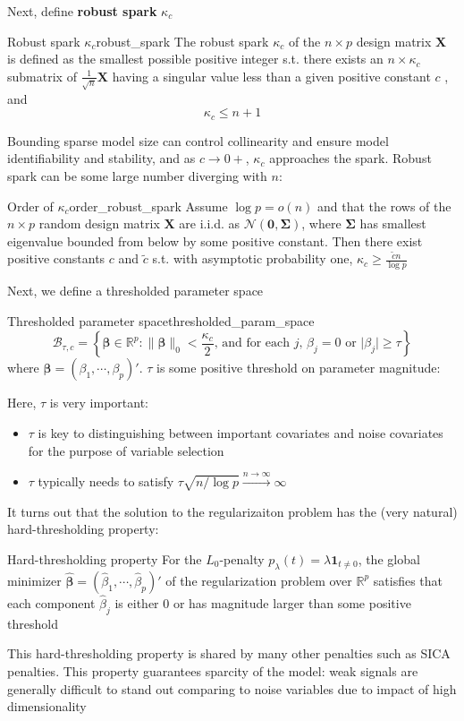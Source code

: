 \documentclass[twoside]{article}
\begin{document}
Next, define \textbf{robust spark} $\kappa_c$
\begin{definition}{Robust spark $\kappa_c$}{robust_spark}
    The robust spark $\kappa_c$ of the $n\times p$ design matrix $\mathbf{X}$ is defined as the smallest possible positive integer s.t. there exists an $n\times \kappa_c$ submatrix of $\frac{1}{\sqrt{n}}\mathbf{X}$ having a singular value less than a given positive constant $c$ \citep{zheng2014high}, and $$\kappa_c\leq n+1$$
\end{definition}
Bounding sparse model size can control collinearity and ensure model identifiability and stability, and as $c\rightarrow 0+$, $\kappa_c$ approaches the spark. Robust spark can be some large number diverging with $n$:
\begin{proposition}{Order of $\kappa_c$}{order_robust_spark}
    Assume $\log p=o(n)$ and that the rows of the $n\times p$ random design matrix $\mathbf{X}$ are i.i.d. as $\mathcal{N}(\mathbf{0},\boldsymbol{\Sigma})$, where $\boldsymbol{\Sigma}$ has smallest eigenvalue bounded from below by some positive constant. Then there exist positive constants $c$ and $\tilde{c}$ s.t. with asymptotic probability one, $\kappa_c \geq \frac{\tilde{c}n}{\log p} $
\end{proposition}

Next, we define a thresholded parameter space
\begin{definition}{Thresholded parameter space}{thresholded_param_space}
    $$
    \mathcal{B}_{\tau,c} = \left\{ \boldsymbol{\beta}\in\mathbb{R}^p: \lVert \boldsymbol{\beta} \rVert _0 <\frac{\kappa_c}{2}\text{, and for each $j$, $\beta_j=0$ or $\lvert \beta_j \rvert \geq \tau$} \right\}
    $$
    where $\boldsymbol{\beta} = \left( \beta_1,\cdots,\beta_p \right)'$. $\tau$ is some positive threshold on parameter magnitude:
\end{definition}
Here, $\tau$ is very important:
\begin{itemize}
    \item $\tau$ is key to distinguishing between important covariates and noise covariates for the purpose of variable selection 
    \item $\tau$ typically needs to satisfy $\tau\sqrt{n/\log p}\xrightarrow{n\rightarrow\infty}\infty$
\end{itemize}

It turns out that the solution to the regularizaiton problem has the (very natural) hard-thresholding property:
\begin{proposition}{Hard-thresholding property}
    For the $L_0$-penalty $p_{\lambda}(t) = \lambda\mathbf{1}_{t\neq 0}$, the global minimizer $\hat{\boldsymbol{\beta}} = \left(\hat{\beta}_1,\cdots,\hat{\beta}_p\right)'$ of the regularization problem over $\mathbb{R}^p$ satisfies that each component $\hat{\beta}_j$ is either 0 or has magnitude larger than some positive threshold
\end{proposition}
This hard-thresholding property is shared by many other penalties such as SICA penalties. This property guarantees sparcity of the model: weak signals are generally difficult to stand out comparing to noise variables due to impact of high dimensionality
\end{document}
